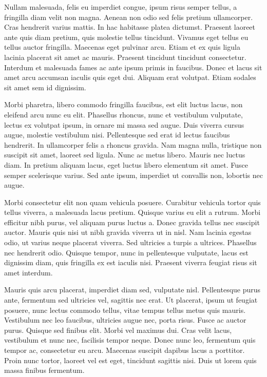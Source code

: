 Nullam malesuada, felis eu imperdiet congue, ipsum risus semper tellus, a fringilla diam velit non magna. Aenean non odio sed felis pretium ullamcorper. Cras hendrerit varius mattis. In hac habitasse platea dictumst. Praesent laoreet ante quis diam pretium, quis molestie tellus tincidunt. Vivamus eget tellus eu tellus auctor fringilla. Maecenas eget pulvinar arcu. Etiam et ex quis ligula lacinia placerat sit amet ac mauris. Praesent tincidunt tincidunt consectetur. Interdum et malesuada fames ac ante ipsum primis in faucibus. Donec et lacus sit amet arcu accumsan iaculis quis eget dui. Aliquam erat volutpat. Etiam sodales sit amet sem id dignissim.

Morbi pharetra, libero commodo fringilla faucibus, est elit luctus lacus, non eleifend arcu nunc eu elit. Phasellus rhoncus, nunc et vestibulum vulputate, lectus ex volutpat ipsum, in ornare mi massa sed augue. Duis viverra cursus augue, molestie vestibulum nisi. Pellentesque sed erat id lectus faucibus hendrerit. In ullamcorper felis a rhoncus gravida. Nam magna nulla, tristique non suscipit sit amet, laoreet sed ligula. Nunc ac metus libero. Mauris nec luctus diam. In pretium aliquam lacus, eget luctus libero elementum sit amet. Fusce semper scelerisque varius. Sed ante ipsum, imperdiet ut convallis non, lobortis nec augue.

Morbi consectetur elit non quam vehicula posuere. Curabitur vehicula tortor quis tellus viverra, a malesuada lacus pretium. Quisque varius eu elit a rutrum. Morbi efficitur nibh purus, vel aliquam purus luctus a. Donec gravida tellus nec suscipit auctor. Mauris quis nisi ut nibh gravida viverra ut in nisl. Nam lacinia egestas odio, ut varius neque placerat viverra. Sed ultricies a turpis a ultrices. Phasellus nec hendrerit odio. Quisque tempor, nunc in pellentesque vulputate, lacus est dignissim diam, quis fringilla ex est iaculis nisi. Praesent viverra feugiat risus sit amet interdum.

Mauris quis arcu placerat, imperdiet diam sed, vulputate nisl. Pellentesque purus ante, fermentum sed ultricies vel, sagittis nec erat. Ut placerat, ipsum ut feugiat posuere, nunc lectus commodo tellus, vitae tempus tellus metus quis mauris. Vestibulum nec leo faucibus, ultricies augue nec, porta risus. Fusce ac auctor purus. Quisque sed finibus elit. Morbi vel maximus dui. Cras velit lacus, vestibulum et nunc nec, facilisis tempor neque. Donec nunc leo, fermentum quis tempor ac, consectetur eu arcu. Maecenas suscipit dapibus lacus a porttitor. Proin nunc tortor, laoreet vel est eget, tincidunt sagittis nisi. Duis ut lorem quis massa finibus fermentum.
